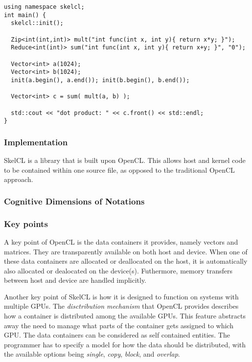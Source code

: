 \begin{lstlisting}[caption={Computation of the dot product of two vectors}, label=code:skelclSample] 
using namespace skelcl;
int main() {
  skelcl::init();

  Zip<int(int,int)> mult("int func(int x, int y){ return x*y; }");
  Reduce<int(int)> sum("int func(int x, int y){ return x+y; }", "0");

  Vector<int> a(1024);
  Vector<int> b(1024);
  init(a.begin(), a.end()); init(b.begin(), b.end());

  Vector<int> c = sum( mult(a, b) );

  std::cout << "dot product: " << c.front() << std::endl;
}
\end{lstlisting}

\subsubsection{Implementation}
SkelCL is a library that is built upon OpenCL. This allows host and kernel code to be contained within one source file, as opposed to the traditional OpenCL approach.

\subsubsection{Cognitive Dimensions of Notations}

\subsubsection{Key points}
A key point of OpenCL is the data containers it provides, namely vectors and matrices. They are transparently available on both host and device. When one of these data containers are allocated or deallocated on the host, it is automatically also allocated or dealocated on the device(s). Futhermore, memory transfers between host and device are handled implicitly.

Another key point of SkelCL is how it is designed to function on systems with multiple GPUs. The \textit{disctribution mechanism} that OpenCL provides describes how a container is distributed among the available GPUs. This feature abstracts away the need to manage what parts of the container gets assigned to which GPU. The data containers can be considered as self contained entities. The programmer has to specify a model for how the data should be distributed, with the available options being \textit{single}, \textit{copy}, \textit{block}, and \textit{overlap}.

